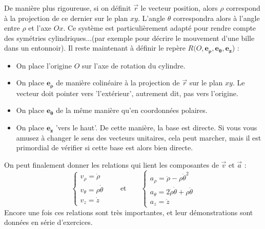 \documentclass{article}
\begin{document}
De manière plus rigoureuse, si on définit $\vec r$ le vecteur position, alors $\rho$ correspond à la projection de ce dernier sur le plan $xy$. L'angle $\theta$ correspondra alors à l'angle entre $\rho$ et l'axe $Ox$.
Ce système est particulièrement adapté pour rendre compte des symétries cylindriques...(par exemple pour décrire le mouvement d'une bille dans un entonnoir).
Il reste maintenant à définir le repère $R(O,\mathbf{e_\rho},\mathbf{e_\theta},\mathbf{e_z}$) : 
\begin{itemize}
    \item On place l'origine $O$ sur l'axe de rotation du cylindre.
    \item On place $\mathbf{e_\rho}$ de manière colinéaire à la projection de $\vec r$ sur le plan $xy$. Le vecteur doit pointer vers 'l'extérieur', autrement dit, pas vers l'origine.
    \item On place $\mathbf{e_\theta}$ de la même manière qu'en coordonnées polaires.
     \item On place $\mathbf{e_z}$ 'vers le haut'. De cette manière, la base est directe. Si vous vous amusez à changer le sens des vecteurs unitaires, cela peut marcher, mais il est primordial de vérifier si cette base est alors bien directe.
\end{itemize}
On peut finalement donner les relations qui lient les composantes de $\vec v$ et $\vec a$ : 
\begin{equation*}    
\begin{cases} v_\rho = \dot \rho \\
v_\theta = \rho\dot \theta \\
v_z = \dot z
\end{cases} \qquad \textrm{et} \qquad 
\begin{cases} a_\rho = \ddot{\rho} - \rho \dot \theta^2 \\
a_\theta = 2\dot \rho \dot \theta + \rho\ddot \theta \\
a_z = \ddot z
\end{cases} 
\end{equation*}
Encore une fois ces relations sont très importantes, et leur démonstrations sont données en série d'exercices.
\end{document}
